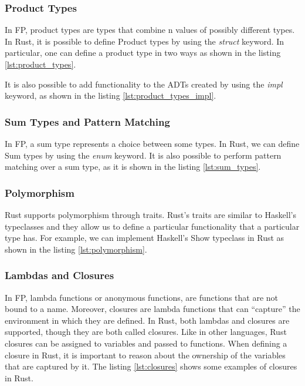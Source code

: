 \subsubsection{Product Types}
In FP, product types are types that combine n values of possibly different types. In Rust, it is possible to define Product types by using the \textit{struct} keyword. In particular, one can define a product type in two ways as shown in the listing \ref{lst:product_types}.



It is also possible to add functionality to the ADTs created by using the \textit{impl} keyword, as shown in the listing \ref{lst:product_types_impl}.



\subsubsection{Sum Types and Pattern Matching}
In FP, a sum type represents a choice between some types. In Rust, we can define Sum types by using the \textit{enum} keyword. It is also possible to perform pattern matching over a sum type, as it is shown in the listing \ref{lst:sum_types}.



\subsubsection{Polymorphism}
Rust supports polymorphism through traits. Rust's traits are similar to Haskell's typeclasses and they allow us to define a particular functionality that a particular type has.
For example, we can implement Haskell's Show typeclass in Rust as shown in the listing \ref{lst:polymorphism}.



\subsubsection{Lambdas and Closures}
In FP, lambda functions or anonymous functions, are functions that are not bound to a name. Moreover, closures are lambda functions that can ``capture'' the environment in which they are defined.
In Rust, both lambdas and closures are supported, though they are both called closures. Like in other languages, Rust closures can be assigned to variables and passed to functions.
When defining a closure in Rust, it is important to reason about the ownership of the variables that are captured by it. The listing \ref{lst:closures} shows some examples of closures in Rust.

